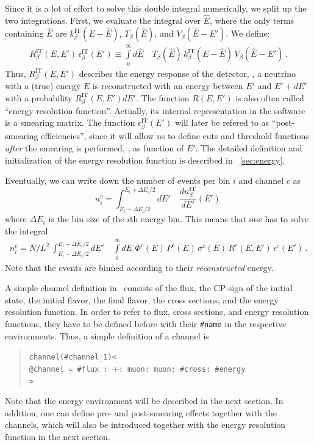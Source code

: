 Since it is a lot of effort to solve this double integral numerically,
we split up the two integrations. First, we evaluate the integral over
$\hat{E}$, where the only terms containing $\hat{E}$ are
$k_\beta^{\text{IT}}(E-\hat{E})$,  $ T_\beta(\hat{E})$, and 
$ V_\beta(\hat{E}-E')$. We define:
\begin{eqnarray}
\label{eq:e_res} 
R_\beta^{\text{IT}}(E,E')\,\epsilon_\beta^{\text{IT}}(E')
 \equiv
\int\limits_0^\infty d\hat{E} \quad T_\beta(\hat{E})\,k_\beta^{\text{IT}}(E-\hat{E})
\,V_\beta(\hat{E}-E')\,. 
\end{eqnarray}
Thus, $R_\beta^{\text{IT}}(E,E')$ describes the energy response of 
the detector, \ie , a neutrino with a (true) energy $E$ is reconstructed
with an energy between $E'$ and $E'+dE'$ with a probability
$R_\beta^{\text{IT}}(E,E') dE'$. The function $R(E,E')$ is also often called ``energy resolution function''. Actually, its internal representation
in the software is a smearing matrix. The function $\epsilon_\beta^{\text{IT}}(E')$ will later be refered to as ``post-smearing efficiencies'', since it will allow us to define cuts and threshold functions {\em after} the smearing is performed, \ie, as function of $E'$. The detailed definition and initialization of the energy resolution function is described in \Sec~\ref{sec:energy}.

Eventually, we can write down the number of events per bin $i$  and channel $c$ as
\begin{equation}
\label{eq:channel}
n_i^c=\int_{E_i-\Delta E_i/2}^{E_i+\Delta E_i/2} dE' \quad
\frac{dn_{\beta}^{\text{IT}}}{dE'} (E') \,
\end{equation}
where $\Delta E_i$ is the bin size of the $i$th energy bin.
This means that one has to solve the integral
\begin{eqnarray}
\label{eq:events_bin}
n_i^c=N/L^2\,\int_{E_i-\Delta E_i/2}^{E_i+\Delta E_i/2} dE' 
\quad \int\limits_0^\infty dE \,\, \Phi^c(E)\,
P^c(E)\,
\sigma^c(E)\,
R^c(E,E')\,
\epsilon^c(E')\,.
\end{eqnarray} 
Note that the events are binned according to their \emph{reconstructed} energy.

A simple channel definition in \GLOBES\ consists of the flux,
the CP-sign of the initial state, the initial flavor, the final flavor,
the cross sections, and the energy resolution function. In order to refer to
flux, cross sections, and energy resolution functions, they have to be 
defined before with their {\tt \#name} in the respective environments. 
Thus, a simple definition of a channel is
\begin{quote}
{\tt channel(\#channel\_1)<\\
\tb @channel = \#flux : $+$: muon: muon: \#cross: \#energy\\
>}
\end{quote}
Note that the energy environment will be described in the next section. 
In addition, one can define pre- and post-smearing effects together
with the channels, which will also be introduced together with the
energy resolution function in the next section.


